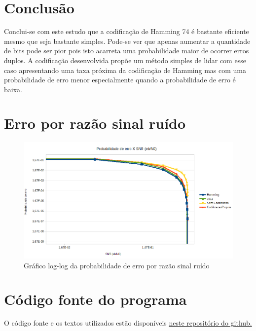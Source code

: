 \documentclass[journal,comsoc]{IEEEtran}
\begin{document}
	\section{Conclusão}
		
		Conclui-se com este estudo que a codificação de Hamming 74 é bastante eficiente mesmo que seja bastante simples. Pode-se ver que apenas aumentar a quantidade de bits pode ser pior pois isto acarreta uma probabilidade maior de ocorrer erros duplos. A codificação desenvolvida propõe um método simples de lidar com esse caso apresentando uma taxa próxima da codificação de Hamming mas com uma probabilidade de erro menor especialmente quando a probabilidade de erro é baixa.
	
	\appendices
	
	\section{Erro por razão sinal ruído}
	\begin{figure}[H]
		\centering
		\includegraphics[width=\columnwidth]{../img/SNR_Pe.png}%
		\caption{Gráfico log-log da probabilidade de erro por razão sinal ruído}%
		\label{fig:A1}%
	\end{figure}
	
	\section{Código fonte do programa}
	O código fonte e os textos utilizados estão disponíveis \href{https://github.com/DylanNS/LAB-3_ELE-32_2017}{neste repositório do github.}
	
\end{document}

